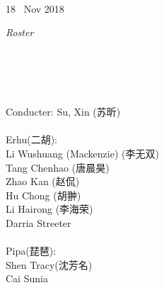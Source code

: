 \documentclass[letter,6pt,poets]{ConcProg}
\begin{document}
\begin{spacing}{0.85}
\begin{programme}{
\\  {\normalsize 18 ~Nov 2018}
}
\begin{part}[]
%

  \end{part}
  
  
\end{programme}

\begin{center}
\Large\textsl{ Roster}
\end{center}

\begin{multicols}{2}%

\\
\\
\\

\\
Conducter: Su, Xin  (苏昕)
\\
\\
 Erhu(二胡):                 \\
Li Wushuang (Mackenzie) (李无双)   \\
Tang Chenhao  (唐晨昊) \\
Zhao Kan (赵侃)\\
Hu Chong (胡翀)\\
Li Hairong (李海荣)\\
Darria Streeter\\
\\
Pipa(琵琶):\\
Shen Tracy(沈芳名)\\
Cai Sunia\\


\end{multicols}
\end{spacing}
\end{document}
